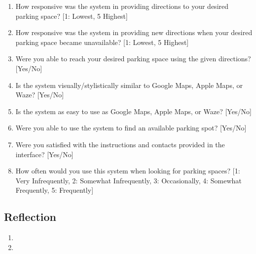 \documentclass[12pt, titlepage]{article}
\begin{document}
\begin{enumerate}
    \item How responsive was the system in providing directions to your desired
    parking space? [1: Lowest, 5 Highest]
    \item How responsive was the system in providing new directions when your
    desired parking space became unavailable? [1: Lowest, 5 Highest]
    \item Were you able to reach your desired parking space using the given
    directions? [Yes/No]
    \item Is the system visually/stylistically similar to Google Maps, Apple
    Maps, or Waze? [Yes/No]
    \item Is the system as easy to use as Google Maps, Apple Maps, or Waze?
    [Yes/No]
    \item Were you able to use the system to find an available parking spot?
    [Yes/No]
    \item Were you satisfied with the instructions and contacts provided in the
    interface? [Yes/No]
    \item How often would you use this system when looking for parking spaces?
    [1: Very Infrequently, 2: Somewhat Infrequently, 3: Occasionally, 4:
    Somewhat Frequently, 5: Frequently]
\end{enumerate}


\newpage{}
\subsection{Reflection}



\begin{enumerate}
  \item {}

  \item {}
\end{enumerate}
\end{document}
